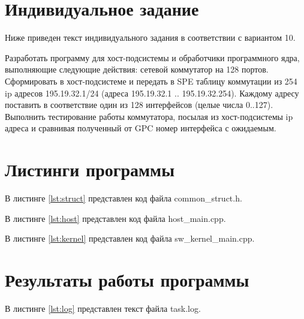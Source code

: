 \tableofcontents
\clearpage

\section{Индивидуальное задание}

Ниже приведен текст индивидуального задания в соответствии с вариантом 10.

Разработать программу для хост-подсистемы и обработчики программного ядра, выполняющие следующие действия:
сетевой коммутатор на 128 портов. Сформировать в хост-подсистеме и передать в SPE таблицу коммутации из 254 ip адресов 195.19.32.1/24 (адреса 195.19.32.1 .. 195.19.32.254). Каждому адресу поставить в соответствие один из 128 интерфейсов (целые числа 0..127). Выполнить тестирование работы коммутатора, посылая из хост-подсистемы ip адреса и сравнивая полученный от GPC номер интерфейса с ожидаемым.

\section{Листинги программы}

В листинге \ref{lst:struct} представлен код файла common\_struct.h.



В листинге \ref{lst:host} представлен код файла host\_main.cpp.



В листинге \ref{lst:kernel} представлен код файла sw\_kernel\_main.cpp.




\section{Результаты работы программы}

В листинге \ref{lst:log} представлен текст файла task.log.

